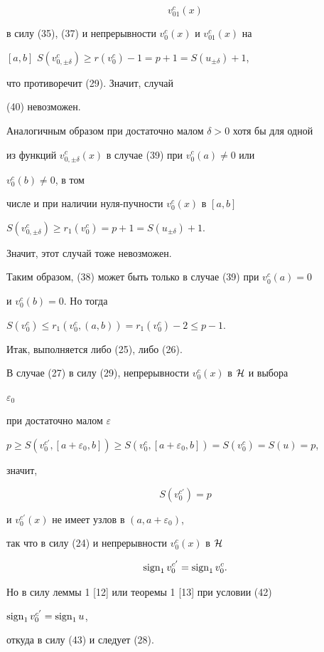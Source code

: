 \begin{pf}
\begin{equation}
v^c_{01}(x) 


\end{equation} 


в силу (35), (37) и непрерывности $v^c_0(x)$ и $v^c_{01}(x)$ на 


$[a,b]$\; $S(v^c_{0,\pm\delta})\ge r(v^c_0)-1=p+1=S(u_{\pm\delta})+1$, 


что противоречит (29). Значит, случай 


(40) невозможен. 


 


Аналогичным образом при достаточно малом $\delta>0$ хотя бы для одной 


из функций $v^c_{0,\pm\delta}(x)$ в случае (39) при $v^c_0(a)\ne0$ или 


$v^c_0(b)\ne0$, в том 


числе и при наличии нуля-пучности $v^c_0(x)$ в $[a,b]$\; 


$S(v^c_{0,\pm\delta})\ge r_1(v^c_0)=p+1=S(u_{\pm\delta})+1$. 


Значит, этот случай тоже невозможен. 


 


Таким образом, (38) может быть только в случае (39) при $v^c_0(a)=0$ 


и $v^c_0(b)=0$. Но тогда 


$S(v^c_0)\le r_1(v^c_0,(a,b))=r_1(v^c_0)-2\le p-1$. 


 


Итак, выполняется либо (25), либо (26). 


 


В случае (27) в силу (29), непрерывности $v^c_0(x)$ в $\cal H$ и выбора 


$\varepsilon_0$ 


при достаточно малом $\varepsilon$\; 


$p\ge S(v^{c'}_0,[a+\varepsilon_0,b])\ge S(v^c_0,[a+\varepsilon_0,b])= 


S(v^c_0)=S(u)=p$, 


значит,


\begin{equation} 


S(v^{c'}_0)=p 


\end{equation} 


и $v^{c'}_0(x)$ не имеет узлов в $(a,a+\varepsilon_0)$, 


так что в силу (24) и непрерывности $v^c_0(x)$ в $\cal H$ 


\begin{equation} 


\sign_1v^{c'}_0=\sign_1v^c_0. 


\end{equation} 


Но в силу леммы 1 [12] или теоремы 1 [13] при условии (42) 


$\operatorname{sign}_1v^{c'}_0=\operatorname{sign}_1u$, 


откуда в силу (43) и следует (28). 


\end{pf} 


